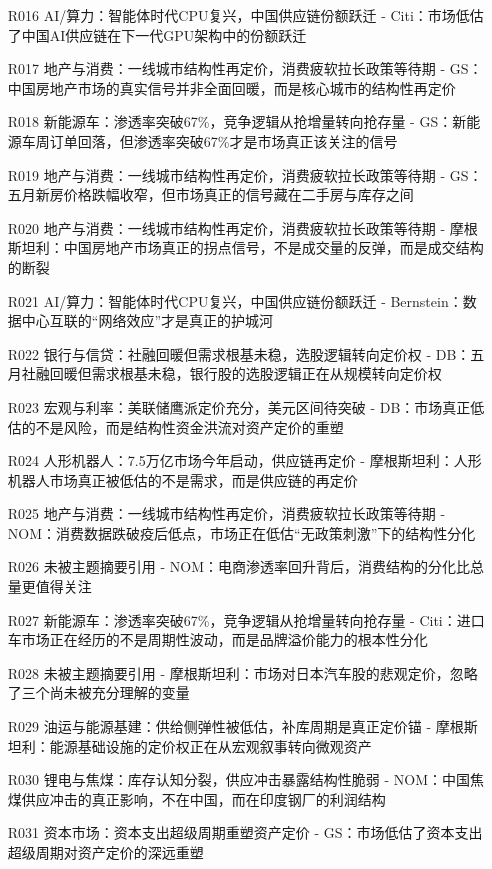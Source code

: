 \documentclass[11pt]{ctexart}
\begin{document}
\begin{itemize}
  \item [R016] AI/算力：智能体时代CPU复兴，中国供应链份额跃迁 - Citi：市场低估了中国AI供应链在下一代GPU架构中的份额跃迁
  \item [R017] 地产与消费：一线城市结构性再定价，消费疲软拉长政策等待期 - GS：中国房地产市场的真实信号并非全面回暖，而是核心城市的结构性再定价
  \item [R018] 新能源车：渗透率突破67\%，竞争逻辑从抢增量转向抢存量 - GS：新能源车周订单回落，但渗透率突破67\%才是市场真正该关注的信号
  \item [R019] 地产与消费：一线城市结构性再定价，消费疲软拉长政策等待期 - GS：五月新房价格跌幅收窄，但市场真正的信号藏在二手房与库存之间
  \item [R020] 地产与消费：一线城市结构性再定价，消费疲软拉长政策等待期 - 摩根斯坦利：中国房地产市场真正的拐点信号，不是成交量的反弹，而是成交结构的断裂
  \item [R021] AI/算力：智能体时代CPU复兴，中国供应链份额跃迁 - Bernstein：数据中心互联的“网络效应”才是真正的护城河
  \item [R022] 银行与信贷：社融回暖但需求根基未稳，选股逻辑转向定价权 - DB：五月社融回暖但需求根基未稳，银行股的选股逻辑正在从规模转向定价权
  \item [R023] 宏观与利率：美联储鹰派定价充分，美元区间待突破 - DB：市场真正低估的不是风险，而是结构性资金洪流对资产定价的重塑
  \item [R024] 人形机器人：7.5万亿市场今年启动，供应链再定价 - 摩根斯坦利：人形机器人市场真正被低估的不是需求，而是供应链的再定价
  \item [R025] 地产与消费：一线城市结构性再定价，消费疲软拉长政策等待期 - NOM：消费数据跌破疫后低点，市场正在低估“无政策刺激”下的结构性分化
  \item [R026] 未被主题摘要引用 - NOM：电商渗透率回升背后，消费结构的分化比总量更值得关注
  \item [R027] 新能源车：渗透率突破67\%，竞争逻辑从抢增量转向抢存量 - Citi：进口车市场正在经历的不是周期性波动，而是品牌溢价能力的根本性分化
  \item [R028] 未被主题摘要引用 - 摩根斯坦利：市场对日本汽车股的悲观定价，忽略了三个尚未被充分理解的变量
  \item [R029] 油运与能源基建：供给侧弹性被低估，补库周期是真正定价锚 - 摩根斯坦利：能源基础设施的定价权正在从宏观叙事转向微观资产
  \item [R030] 锂电与焦煤：库存认知分裂，供应冲击暴露结构性脆弱 - NOM：中国焦煤供应冲击的真正影响，不在中国，而在印度钢厂的利润结构
  \item [R031] 资本市场：资本支出超级周期重塑资产定价 - GS：市场低估了资本支出超级周期对资产定价的深远重塑

\end{itemize}
\end{document}
